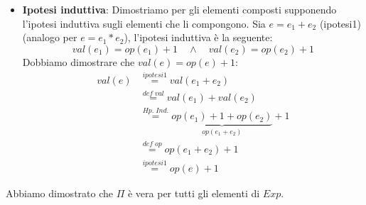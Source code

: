 \documentclass[a4paper]{article}
\begin{document}
\begin{Example}{}{}
\begin{itemize}
      \item \textbf{Ipotesi induttiva}: Dimostriamo per gli elementi composti supponendo
        l'ipotesi induttiva sugli elementi che li compongono. Sia \( e = e_1 + e_2 \) (ipotesi1)
        (analogo per \( e = e_1 * e_2 \)), l'ipotesi induttiva è la seguente:
        \[
          val(e_1) = op(e_1) + 1 \quad \land \quad val(e_2) = op(e_2) + 1
        \] 
        Dobbiamo dimostrare che \( val(e) = op(e) + 1 \):
        \[
          \begin{aligned}
            val(e) &\stackrel{ipotesi1}{=} val(e_1 + e_2) \\
                   &\stackrel{def\; val}{=} val(e_1) + val(e_2) \\
                   &\stackrel{Hp.\; Ind.}{=} \underbrace{op(e_1) + 1 + op(e_2)}_{op(e_1 + e_2)} + 1 \\
                   &\stackrel{def\; op}{=} op(e_1 + e_2) + 1 \\
                   &\stackrel{ipotesi1}{=} op(e) + 1
          \end{aligned}
        \] 
    \end{itemize}
    Abbiamo dimostrato che \( \Pi \) è vera per tutti gli elementi di \( Exp \).
\end{Example} 
\end{document}
